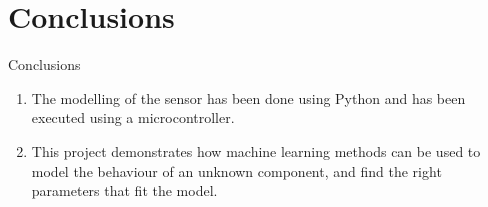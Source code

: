 \documentclass{beamer}
\theoremstyle{remark}
\begin{document}
\section{Conclusions}
\begin{frame}{Conclusions}
\begin{enumerate}
\item The modelling of the sensor has been done using Python and has been executed using a microcontroller.
\item This project demonstrates how machine learning methods can be used to model the behaviour of an unknown component, and find the right parameters that fit the model.
\end{enumerate}
\end{frame}
\end{document}
